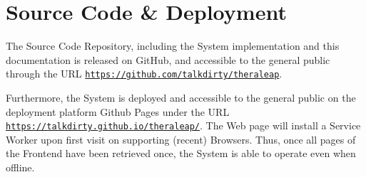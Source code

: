 \chapter{Source Code \& Deployment}
\label{app:code}
The Source Code Repository, including the System implementation and this documentation is released on GitHub, and accessible to the general public through the URL \texttt{\url{https://github.com/talkdirty/theraleap}}.

Furthermore, the System is deployed and accessible to the general public on the deployment platform Github Pages under the URL \texttt{\url{https://talkdirty.github.io/theraleap/}}. The Web page will install a Service Worker upon first visit on supporting (recent) Browsers. Thus, once all pages of the Frontend have been retrieved once, the System is able to operate even when offline.